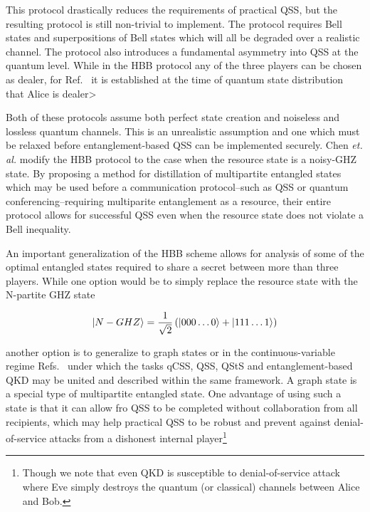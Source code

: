 This protocol drastically reduces the requirements of practical QSS, but the resulting protocol is still non-trivial to implement. The protocol requires Bell states and superpositions of Bell states which will all be degraded over a realistic channel.  The protocol also introduces a fundamental asymmetry into QSS at the quantum level. While in the HBB protocol any of the three players can be chosen as dealer, for Ref.~\cite{Karlsson1999} it is established at the time of quantum state distribution that Alice is dealer>%

Both of these protocols \cite{Hillery1999, Karlsson1999} assume both perfect state creation and noiseless and lossless quantum channels. This is an unrealistic assumption and one which must be relaxed before entanglement-based QSS can be implemented securely. Chen \emph{et. al.} \cite{Chen2005a} modify the HBB protocol to the case when the resource state is a noisy-GHZ state. By proposing a method for distillation of multipartite entangled states which may be used before a communication protocol--such as QSS or quantum conferencing--requiring multiparite entanglement as a resource, their entire protocol allows for successful QSS even when the resource state does not violate a Bell inequality.


An important generalization of the HBB scheme allows for analysis of some of the optimal entangled states required to share a secret between more than three players. While one option would be to simply replace the resource state with the N-partite GHZ state

\begin{equation}
\ket{N-GHZ} = \frac{1}{\sqrt{2}}\left(\ket{000\dots0} + \ket{111\dots1} \right)
\end{equation}

\noindent another option is to generalize to graph states \cite{Markham2008a, Keet2010} or in the continuous-variable regime Refs.~\cite{Lau2013, Wu2016} under which the tasks qCSS, QSS, QStS and entanglement-based QKD may be united and described within the same framework. A graph state is a special type of multipartite entangled state. One advantage of using such a state is that it can allow fro QSS to be completed without collaboration from all recipients, which may help practical QSS to be robust and prevent against denial-of-service attacks from a dishonest internal player\footnote{Though we note that even QKD is susceptible to denial-of-service attack where Eve simply destroys the quantum (or classical) channels between Alice and Bob.}

